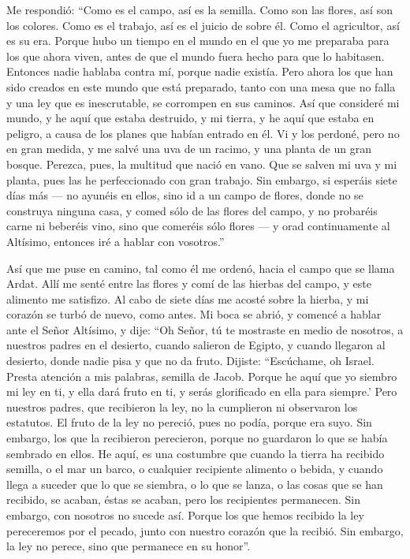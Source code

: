  Me respondió: ``Como es el campo, así es la semilla.
Como son las flores, así son los colores. Como es el trabajo, así es el
juicio de sobre él. Como el agricultor, así es su era. Porque hubo un
tiempo en el mundo  en el que yo me preparaba para los
que ahora viven, antes de que el mundo fuera hecho para que lo
habitasen. Entonces nadie hablaba contra mí,  porque
nadie existía. Pero ahora los que han sido creados en este mundo que
está preparado, tanto con una mesa que no falla y una ley que es
inescrutable, se corrompen en sus caminos.  Así que
consideré mi mundo, y he aquí que estaba destruido, y mi tierra, y he
aquí que estaba en peligro, a causa de los planes que habían entrado en
él.  Vi y los perdoné, pero no en gran medida, y me salvé
una uva de un racimo, y una planta de un gran bosque. 
Perezca, pues, la multitud que nació en vano. Que se salven mi uva y mi
planta, pues las he perfeccionado con gran trabajo.  Sin
embargo, si esperáis siete días más --- no ayunéis en ellos,
 sino id a un campo de flores, donde no se construya
ninguna casa, y comed sólo de las flores del campo, y no probaréis carne
ni beberéis vino, sino que comeréis sólo flores ---  y
orad continuamente al Altísimo, entonces iré a hablar con vosotros.''

 Así que me puse en camino, tal como él me ordenó, hacia
el campo que se llama Ardat. Allí me senté entre las flores y comí de
las hierbas del campo, y este alimento me satisfizo.  Al
cabo de siete días me acosté sobre la hierba, y mi corazón se turbó de
nuevo, como antes.  Mi boca se abrió, y comencé a hablar
ante el Señor Altísimo, y dije:  ``Oh Señor, tú te
mostraste en medio de nosotros, a nuestros padres en el desierto, cuando
salieron de Egipto, y cuando llegaron al desierto, donde nadie pisa y
que no da fruto.  Dijiste: ``Escúchame, oh Israel. Presta
atención a mis palabras, semilla de Jacob.  Porque he
aquí que yo siembro mi ley en ti, y ella dará fruto en ti, y serás
glorificado en ella para siempre.'  Pero nuestros padres,
que recibieron la ley, no la cumplieron ni observaron los estatutos. El
fruto de la ley no pereció, pues no podía, porque era suyo.
 Sin embargo, los que la recibieron perecieron, porque no
guardaron lo que se había sembrado en ellos.  He aquí, es
una costumbre que cuando la tierra ha recibido semilla, o el mar un
barco, o cualquier recipiente alimento o bebida, y cuando llega a
suceder que lo que se siembra, o lo que se lanza,  o las
cosas que se han recibido, se acaban, éstas se acaban, pero los
recipientes permanecen. Sin embargo, con nosotros no sucede así.
 Porque los que hemos recibido la ley pereceremos por el
pecado, junto con nuestro corazón que la recibió.  Sin
embargo, la ley no perece, sino que permanece en su honor''.

